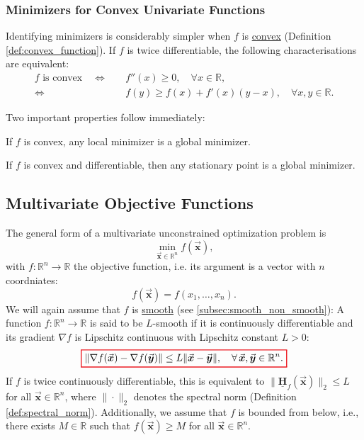 \documentclass[9pt, headings=standardclasses, parskip=half]{scrartcl}
\newcommand{\matr}[1]{\underline{\boldsymbol{#1}}}
\newcommand{\vect}[1]{\vec{\boldsymbol{#1}}}
\begin{document}
\subsubsection{Minimizers for Convex Univariate Functions}
Identifying minimizers is considerably simpler when \(f\) is \hyperref[def:convex_function]{convex} (Definition \ref{def:convex_function}). 
If \(f\) is twice differentiable, the following characterisations are equivalent:
\[
\begin{aligned}
f\text{ is convex} \quad \Longleftrightarrow & \quad f''(x)\ge0,\quad \forall x\in\mathbb{R},\\[1mm]
\Longleftrightarrow & \quad f(y)\ge f(x)+f'(x)(y-x),\quad \forall x,y\in\mathbb{R}.
\end{aligned}
\]

Two important properties follow immediately:

\begin{proposition}
If \(f\) is convex, any local minimizer is a global minimizer.
\end{proposition}

\begin{proposition}
If \(f\) is convex and differentiable, then any stationary point is a global minimizer.
\end{proposition}


\subsection{Multivariate Objective Functions}

The general form of a multivariate unconstrained optimization problem is
\[
\min_{\vect{x}\in\mathbb{R}^n} f(\vect{x}),
\]
with \(f:\mathbb{R}^n\to\mathbb{R}\) the objective function, i.e. its argument is a vector with \(n\) coordniates:
\[
f(\vect{x})=f(x_1, \ldots, x_n).
\]
We will again assume that \(f\) is \hyperref[subsec:smooth_non_smooth]{smooth} (see \ref{subsec:smooth_non_smooth}):
A function \(f:\mathbb{R}^n\to\mathbb{R}\) is said to be {\color{red}\(L\)-smooth} if it is continuously differentiable and its gradient \(\nabla f\) is Lipschitz continuous with Lipschitz constant \(L>0\):
\begin{equation}
  \label{eq:L-smoothness_multivariate}
  {\color{Red}
  \setlength{\fboxrule}{1pt}
  \boxed{ 
  \color{black}
\|\nabla f(\vect{x})-\nabla f(\vect{y})\|\le L\|\vect{x}-\vect{y}\|,\quad \forall\, \vect{x},\vect{y}\in\mathbb{R}^n \text{.}
  }
  }
\end{equation}
If \(f\) is twice continuously differentiable, this is equivalent to \(\|\matr{H}_f(\vect{x})\|_{2}\le L\) for all \(\vect{x}\in\mathbb{R}^n\), where \(\|\cdot\|_{2}\) denotes the spectral norm (Definition \ref{def:spectral_norm}).
Additionally, we assume that \(f\) is bounded from below, i.e., there exists \(M\in\mathbb{R}\) such that \(f(\vect{x})\ge M\) for all \(\vect{x}\in\mathbb{R}^n\).
\end{document}
